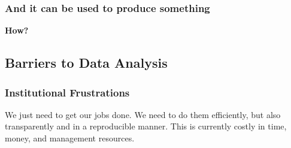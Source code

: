 \documentclass{beamer}
\begin{document}
{
\begin{frame}[plain]
\frametitle{And it can be used to produce something}
\end{frame}
}


\begin{frame}
\begin{center}
\Huge \textbf{How?}
\end{center}
\end{frame}

\subsection{Barriers to Data Analysis}

\begin{frame}
\frametitle{Institutional Frustrations}
We just need to get our jobs done. We need to do them efficiently, but also transparently and in a reproducible manner. This is currently costly in time, money, and management resources.
\end{frame}

{
\begin{frame}[plain]
\end{frame}
}
\end{document}
